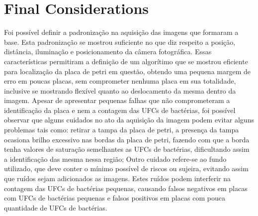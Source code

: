 
\chapter{Final Considerations} \label{cap:concl}


Foi possível definir a padronização na aquisição das imagens que formaram a base. Esta padronização se mostrou suficiente no que diz respeito a posição, distância, iluminação e posicionamento da câmera fotográfica. Essas características permitiram a definição de um algorítimo que se mostrou eficiente para localização da placa de petri em questão, obtendo uma pequena margem de erro em poucas placas, sem comprometer nenhuma placa em sua totalidade, inclusive se mostrando flexível quanto ao deslocamento da mesma dentro da imagem. Apesar de apresentar pequenas falhas que não comprometeram a identificação da placa e nem a contagem das UFCs de bactérias, foi possível observar que alguns cuidados no ato da aquisição da imagem podem evitar alguns problemas tais como: retirar a tampa da placa de petri, a presença da tampa ocasiona brilho excessivo nas bordas da placa de petri, fazendo com que a borda tenha valores de saturação semelhantes as UFCs de bactérias, dificultando assim a identificação das mesma nessa região; Outro cuidado refere-se ao fundo utilizado, que deve conter o mínimo possível de riscos ou sujeira, evitando assim que ruídos sejam adicionados as imagens. Estes ruídos podem interferir na contagem das UFCs de bactérias pequenas, causando falsos negativos em placas com UFCs de bactérias pequenas e falsos positivos em placas com pouca quantidade de UFCs de bactérias.

